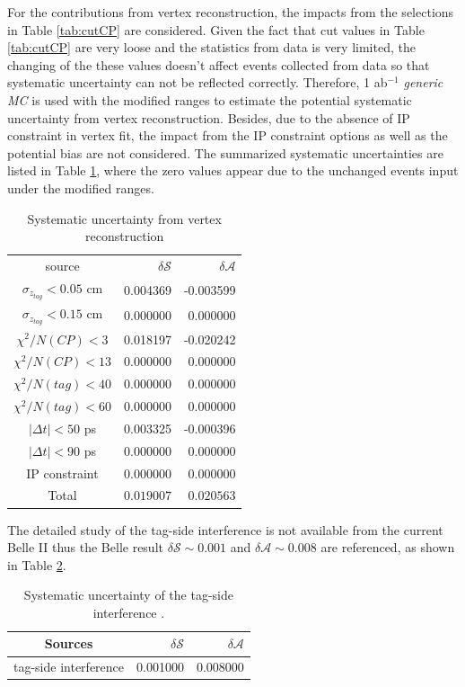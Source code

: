 For the contributions from vertex reconstruction, the impacts from the selections in Table \ref{tab:cutCP} are considered. Given the fact that cut values in Table \ref{tab:cutCP} are very loose and the statistics from data is very limited, the changing of the these values doesn't affect events collected from data so that systematic uncertainty can not be reflected correctly. Therefore, 1 ab$^{-1}$ \textit{generic MC} is used with the modified ranges to estimate the potential systematic uncertainty from vertex reconstruction. Besides, due to the absence of IP constraint in vertex fit, the impact from the IP constraint options as well as the potential bias are not considered. The summarized systematic uncertainties are listed in Table \ref{tab:sy_vertex}, where the zero values appear due to the unchanged events input under the modified ranges.

\begin{table}[htpb]
	\begin{minipage}[b]{1.0\linewidth}
		\centering
		\caption{Systematic uncertainty from vertex reconstruction}
		\label{tab:sy_vertex}
		\begin{tabular}{c r r}
			\hline
			source & $\delta \mathcal{S}$ & $\delta \mathcal{A}$ \\
			$\sigma_{z_{tag}}<0.05$ cm & 0.004369
& -0.003599
\\
			$\sigma_{z_{tag}}<0.15$ cm & 0.000000 & 0.000000 \\
			$\chi^2/N(CP)<3$ & 0.018197
& -0.020242
\\
			$\chi^2/N(CP)<13$ & 0.000000 & 0.000000\\
			$\chi^2/N(tag)<40$ & 0.000000
& 0.000000
\\
			$\chi^2/N(tag)<60$ & 0.000000 & 0.000000\\
			$|\Delta t|<50 $ ps & 0.003325
& -0.000396
\\
			$|\Delta t|<90 $ ps & 0.000000 & 0.000000\\
			IP constraint & 0.000000& 0.000000\\
						\hline
							Total &
						{$0.019007$} &
						{$0.020563$}\\
						\hline
		\end{tabular}
	\end{minipage}
\end{table}

The detailed study of the tag-side interference is not available from the current Belle II thus the Belle result $\delta \mathcal{S}\sim 0.001$ and $\delta \mathcal{A}\sim 0.008$ are referenced\cite{yosuke2011measurement}, as shown in Table \ref{tab:sy_tagside}.
\begin{table}
	\centering
	\caption{Systematic uncertainty of the tag-side interference .  }
	\label{tab:sy_tagside}
	\begin{tabular}{c|r|r} 
		\hline
		Sources &  $\delta \mathcal{S}$ & $\delta \mathcal{A}$\\
		\hline
		tag-side interference & 0.001000 & 0.008000\\
		\hline
	\end{tabular}
	
\end{table}

